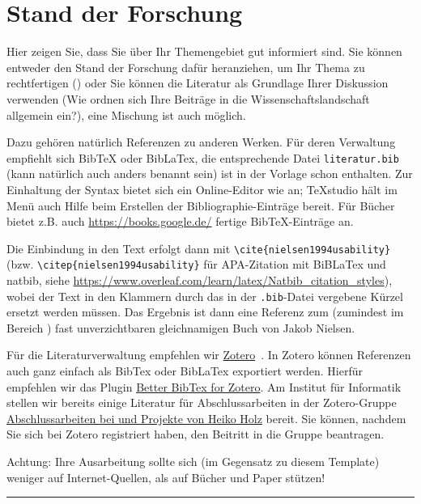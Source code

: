 
\chapter{Stand der Forschung}
Hier zeigen Sie, dass Sie über Ihr Themengebiet gut informiert sind. Sie können entweder den Stand der Forschung dafür heranziehen, um Ihr Thema zu rechtfertigen () oder Sie können die Literatur als Grundlage Ihrer Diskussion verwenden (Wie ordnen sich Ihre Beiträge in die Wissenschaftslandschaft allgemein ein?), eine Mischung ist auch möglich.

Dazu gehören natürlich Referenzen zu anderen Werken. Für deren Verwaltung empfiehlt sich BibTeX oder BibLaTex, die entsprechende Datei \verb|literatur.bib| (kann natürlich auch anders benannt sein) ist in der Vorlage schon enthalten. Zur Einhaltung der Syntax bietet sich ein Online-Editor wie \cite{BibTexOnlineEditor} an; TeXstudio \cite{texstudio} hält im Menü auch Hilfe beim Erstellen der Bibliographie-Einträge bereit. Für Bücher bietet z.B. auch \url{https://books.google.de/} fertige BibTeX-Einträge an.

Die Einbindung in den Text erfolgt dann mit \verb|\cite{nielsen1994usability}| (bzw. \verb|\citep{nielsen1994usability}| für APA-Zitation mit BiBLaTex und natbib, siehe \url{https://www.overleaf.com/learn/latex/Natbib_citation_styles}), wobei der Text in den Klammern durch das in der \verb|.bib|-Datei vergebene Kürzel ersetzt werden müssen. Das Ergebnis ist dann eine Referenz zum (zumindest im Bereich ) fast unverzichtbaren gleichnamigen Buch \cite{nielsen1994usability} von Jakob Nielsen.

Für die Literaturverwaltung empfehlen wir \href{https://www.zotero.org/}{Zotero}~\cite{zotero}. In Zotero können Referenzen auch ganz einfach als BibTex oder BibLaTex exportiert werden. Hierfür empfehlen wir das Plugin \href{https://github.com/retorquere/zotero-better-bibtex}{Better BibTex for Zotero}. Am Institut für Informatik stellen wir bereits einige Literatur für Abschlussarbeiten in der Zotero-Gruppe \href{https://www.zotero.org/groups/5530859/}{
Abschlussarbeiten bei und Projekte von Heiko Holz} bereit. Sie können, nachdem Sie sich bei Zotero registriert haben, den Beitritt in die Gruppe beantragen.

Achtung: Ihre Ausarbeitung sollte sich (im Gegensatz zu diesem Template) weniger auf Internet-Quellen, als auf Bücher und Paper stützen!
\\

\hfil\rule{0.4\textwidth}{0.4pt}

\Blindtext[5]

